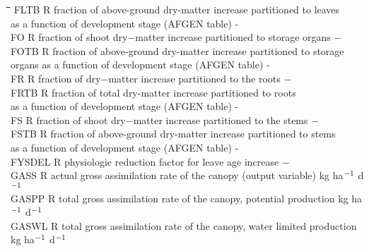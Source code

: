 \documentclass[11pt]{article}
\begin{document}
\begin{tabbing}
\hspace{1.27cm}\=\hspace{1.27cm}\=\hspace{1.27cm}\=\hspace{1.27cm}\=%
\hspace{1.27cm}\=\hspace{1.27cm}\=\hspace{1.27cm}\=\hspace{1.27cm}\=%
\hspace{1.27cm}\=\hspace{1.27cm}\=\kill
FLTB\> \> R\> fraction of above-ground dry-matter increase partitioned to leaves\\
\>\> \> as a function of development stage (AFGEN table)\> \> \> \> \> \> \> -\\
FO      \> \> R   \> fraction of shoot dry$-$matter increase partitioned to storage organs\> \> \> \> \> \> \> $-$\\
FOTB\> \> R\> fraction of above-ground dry-matter increase partitioned to storage\\
\>\> \> organs as a function of development stage (AFGEN table)\> \> \> \> \> \> \> -\\
FR      \> \> R   \> fraction of dry$-$matter increase partitioned to the roots      \> \> \> \> \> \> \> $-$\\
FRTB\> \> R\> fraction of total dry-matter increase partitioned to roots\\
\>\> \> as a function of development stage (AFGEN table)\> \> \> \> \> \> \> -\\
FS      \> \> R   \> fraction of shoot dry$-$matter increase partitioned to the stems \> \> \> \> \> \> \> $-$\\
FSTB\> \> R\> fraction of above-ground dry-matter increase partitioned to stems\\
\>\> \> as a function of development stage (AFGEN table)\> \> \> \> \> \> \> -\\
FYSDEL  \> \> R   \> physiologic reduction factor for leave age increase            \> \> \> \> \> \> \> $-$\\
GASS\> \> R\> actual gross assimilation rate of the canopy (output variable)\> \> \> \> \> \> \> kg ha$^{{\rm -1}}$ d$^{{\rm -1}}$\\
GASPP\> \> R\> total gross assimilation rate of the canopy, potential production  \> \> \> \> \> \> \> kg ha$^{{\rm -1}}$ d$^{{\rm -1}}$\\
GASWL\> \> R\> total gross assimilation rate of the canopy, water limited production  \> \> \> \> \> \> \> kg ha$^{{\rm -1}}$ d$^{{\rm -1}}$\\

\end{tabbing}
\end{document}
